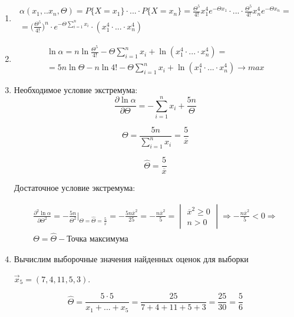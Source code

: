 \documentclass[a4paper,14pt]{extreport} %
\begin{document}
\begin{enumerate}

\item

\begin{multline*}
\alpha(x_1,..x_n,\Theta)=P\{X=x_1\}\cdot ... \cdot P\{X=x_n\}=\frac{\Theta^5}{4!}x_1^4 e^{-\Theta x_1}\cdot ... \cdot \frac{\Theta^5}{4!}x_n^4 e^{-\Theta x_n}=\\
=\bigg(\frac{\Theta^5}{4!}\bigg)^n \cdot e^{-\Theta \sum_{i=1}^{n}x_i}\cdot (x_1^4\cdot ... \cdot x_n^4)
\end{multline*}

\item

\begin{multline*}
\ln \alpha= n\ln\frac{\Theta^5}{4!}  -\Theta \sum_{i=1}^{n}x_i + \ln(x_1^4\cdot ... \cdot x_n^4)=\\=5n\ln\Theta-n\ln4!-\Theta \sum_{i=1}^{n}x_i + \ln(x_1^4\cdot ... \cdot x_n^4) \rightarrow max
\end{multline*}

\item

Необходимое условие экстремума:
$$\frac{\partial \ln\alpha}{\partial \Theta}=-\sum_{i=1}^{n}x_i + \frac{5n}{\Theta}$$

$$\Theta=\frac{5n}{\sum_{i=1}^{n}x_i}=\frac{5}{\overline x}$$

$$\hat \Theta = \frac{5}{\overline x}$$

Достаточное условие экстремума:

\begin{multline*}
\frac{\partial^2 \ln\alpha}{\partial \Theta^2}=-\frac{5n}{\Theta^2}\bigg|_{\Theta = \hat \Theta = \frac{5}{\overline x}}=-\frac{5n\overline x^2}{25}=-\frac{n\overline x^2}{5}=
\begin{vmatrix}
\overline x^2\ge 0\\
n > 0
\end{vmatrix} \Rightarrow -\frac{n\overline x^2}{5} < 0  \Rightarrow \\ \Theta = \hat \Theta - \text{Точка максимума}
\end{multline*}

\item Вычислим выборочные значения найденных оценок для выборки 

$\vec x_5 = (7,4,11,5,3)$. 

$$\hat \Theta = \frac{5\cdot 5}{x_1+...+x_5}=\frac{25}{7+4+11+5+3}=\frac{25}{30}=\frac{5}{6}$$
\end{enumerate}
\end{document}
